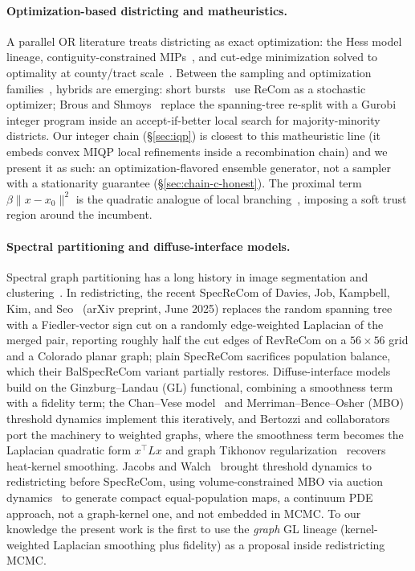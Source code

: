 \documentclass[11pt]{article}
\begin{document}
\paragraph{Optimization-based districting and matheuristics.}\label{sec:related-opt}

A parallel OR literature treats districting as exact optimization:
the Hess model lineage, contiguity-constrained
MIPs~\cite{validi2022imposing}, and cut-edge minimization solved to
optimality at county/tract scale~\cite{validi2022political}. Between
the sampling and optimization families~\cite{becker2022redistricting},
hybrids are emerging: short bursts~\cite{cannon2023voting} use ReCom
as a stochastic optimizer; Brous and Shmoys~\cite{brous2025recom}
replace the spanning-tree re-split with a Gurobi integer program
inside an accept-if-better local search for majority-minority
districts. Our integer chain (\S\ref{sec:iqp}) is closest to this
matheuristic line (it embeds convex MIQP local refinements inside a
recombination chain) and we present it as such: an
optimization-flavored ensemble generator, not a sampler with a
stationarity guarantee (\S\ref{sec:chain-c-honest}). The proximal
term $\beta\|x - x_0\|^2$ is the quadratic analogue of local
branching~\cite{fischetti2003local}, imposing a soft trust region
around the incumbent.

\paragraph{Spectral partitioning and diffuse-interface models.}\label{sec:related-spectral}

Spectral graph partitioning has a long history in image segmentation
and clustering~\cite{shi2000normalized}. In redistricting, the recent
SpecReCom of Davies, Job, Kampbell, Kim, and
Seo~\cite{davies2025spectral} (arXiv preprint, June 2025) replaces the
random spanning tree with a Fiedler-vector sign cut on a randomly
edge-weighted Laplacian of the merged pair, reporting roughly half the
cut edges of RevReCom on a $56 \times 56$ grid and a Colorado planar
graph; plain SpecReCom sacrifices population balance, which their
BalSpecReCom variant partially restores. Diffuse-interface models
build on the Ginzburg--Landau (GL) functional, combining a smoothness
term with a fidelity term; the Chan--Vese model~\cite{chan2001active}
and Merriman--Bence--Osher (MBO) threshold dynamics implement this
iteratively, and Bertozzi and collaborators~\cite{bertozzi2012diffuse,
merkurjev2013mbo} port the machinery to weighted graphs, where the
smoothness term becomes the Laplacian quadratic form $x^\top L x$ and
graph Tikhonov regularization~\cite{pilavci2021graph,shuman2013emerging}
recovers heat-kernel smoothing. Jacobs and Walch~\cite{jacobs2018pde}
brought threshold dynamics to redistricting before SpecReCom, using
volume-constrained MBO via auction dynamics~\cite{jacobs2018auction}
to generate compact equal-population maps, a continuum PDE
approach, not a graph-kernel one, and not embedded in MCMC. To our
knowledge the present work is the first to use the \emph{graph} GL
lineage (kernel-weighted Laplacian smoothing plus fidelity) as a
proposal inside redistricting MCMC.
\end{document}
